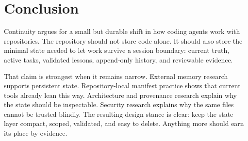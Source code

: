 
\section{Conclusion}

Continuity argues for a small but durable shift in how coding agents work with repositories. The repository should not store code alone. It should also store the minimal state needed to let work survive a session boundary: current truth, active tasks, validated lessons, append-only history, and reviewable evidence.

That claim is strongest when it remains narrow. External memory research supports persistent state. Repository-local manifest practice shows that current tools already lean this way. Architecture and provenance research explain why the state should be inspectable. Security research explains why the same files cannot be trusted blindly. The resulting design stance is clear: keep the state layer compact, scoped, validated, and easy to delete. Anything more should earn its place by evidence.
